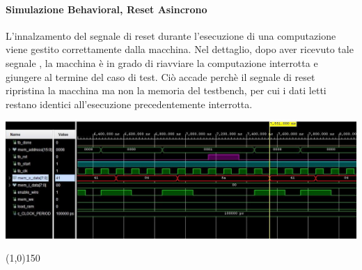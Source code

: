 \documentclass{article}
\begin{document}
\paragraph{Simulazione Behavioral, Reset Asincrono}

L'innalzamento del segnale di reset durante l'esecuzione di una computazione viene gestito correttamente dalla macchina. Nel dettaglio, dopo aver ricevuto tale segnale , la macchina è in grado di riavviare la computazione interrotta e giungere al termine del caso di test. Ciò accade perchè il segnale di reset ripristina la macchina ma non la memoria del testbench, per cui i dati letti restano identici all'esecuzione precedentemente interrotta.

\begin{flushleft}
\includegraphics[scale=0.53]{Rst_Async} \\
\end{flushleft}

\bigskip

\begin{center}
\line(1,0){150}
\end{center}

\bigskip
\end{document}
